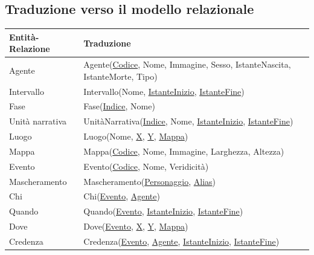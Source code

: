 \documentclass{article}
\begin{document}
\subsection{Traduzione verso il modello relazionale}

\begin{center}\begin{tabular}{|p{}|p{}|}
		\hline
		\textbf{Entità-Relazione} & \textbf{Traduzione}                                                                                  \\
		\hline
		Agente                    & Agente(\underline{Codice}, Nome, Immagine, Sesso, IstanteNascita, IstanteMorte, Tipo)                \\
		\hline
		Intervallo                & Intervallo(Nome, \underline{IstanteInizio}, \underline{IstanteFine})                                 \\
		\hline
		Fase                      & Fase(\underline{Indice}, Nome)                                                                       \\
		\hline
		Unità narrativa           & UnitàNarrativa(\underline{Indice}, Nome, \underline{IstanteInizio}, \underline{IstanteFine})         \\
		\hline
		Luogo                     & Luogo(Nome, \underline{X}, \underline{Y}, \underline{Mappa})                                         \\
		\hline
		Mappa                     & Mappa(\underline{Codice}, Nome, Immagine, Larghezza, Altezza)                                        \\
		\hline
		Evento                    & Evento(\underline{Codice}, Nome, Veridicità)                                                         \\
		\hline
		Mascheramento             & Mascheramento(\underline{Personaggio}, \underline{Alias})                                            \\
		\hline
		Chi                       & Chi(\underline{Evento}, \underline{Agente})                                                          \\
		\hline
		Quando                    & Quando(\underline{Evento}, \underline{IstanteInizio}, \underline{IstanteFine})                       \\
		\hline
		Dove                      & Dove(\underline{Evento}, \underline{X}, \underline{Y}, \underline{Mappa})                            \\
		\hline
		Credenza                  & Credenza(\underline{Evento}, \underline{Agente}, \underline{IstanteInizio}, \underline{IstanteFine}) \\
		\hline
	\end{tabular}\end{center}
\end{document}
